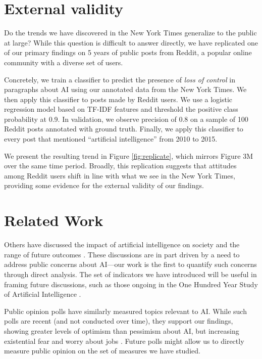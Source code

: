 \documentclass[letterpaper]{article}
\begin{document}
\vspace{-2.36mm}
\section{External validity}

Do the trends we have discovered in the New York Times generalize to the public at large? While this question is difficult to answer directly, we have replicated one of our primary findings on 5 years of public posts from Reddit, a popular online community with a diverse set of users.

Concretely, we train a classifier to predict the presence of \textit{loss of control} in paragraphs about AI using our annotated data from the New York Times. We then apply this classifier to posts made by Reddit users. We use a logistic regression model based on TF-IDF features and threshold the positive class probability at 0.9. In validation, we observe precision of 0.8 on a sample of 100 Reddit posts annotated with ground truth. Finally, we apply this classifier to every post that mentioned ``artificial intelligence'' from 2010 to 2015.

We present the resulting trend in Figure \ref{fig:replicate}, which mirrors Figure 3M over the same time period. Broadly, this replication suggests that attitudes among Reddit users shift in line with what we see in the New York Times, providing some evidence for the external validity of our findings.

\section{Related Work}

Others have discussed the impact of artificial intelligence on society and the range of future outcomes \cite{ai-concerns}. These discussions are in part driven by a need to address public concerns about AI---our work is the first to quantify such concerns through direct analysis. The set of indicators we have introduced will be useful in framing future discussions, such as those ongoing in the One Hundred Year Study of Artificial Intelligence \cite{100years}.

Public opinion polls have similarly measured topics relevant to AI. While such polls are recent (and not conducted over time), they support our findings, showing greater levels of optimism than pessimism about AI, but increasing existential fear and worry about jobs \cite{bsa-poll,cbs-poll}. Future polls might allow us to directly measure public opinion on the set of measures we have studied.
\end{document}
